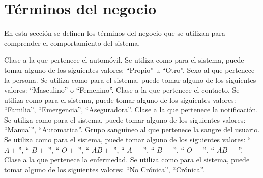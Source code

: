 \section{Términos del negocio}
\label{gls:terminosNegocio}
En esta sección se definen los términos del negocio que se utilizan para comprender el comportamiento del sistema.

\begin{description}
    
     Clase a la que pertenece el automóvil. Se utiliza como  para el sistema, puede tomar alguno de los siguientes valores: ``Propio'' u ``Otro''.
     Sexo al que pertenece la persona. Se utiliza como  para el sistema, puede tomar alguno de los siguientes valores: ``Masculino'' o ``Femenino''.
 	 Clase a la que pertenece el contacto. Se utiliza como  para el sistema, puede tomar alguno de los siguientes valores: ``Familia'', ``Emergencia'', ``Aseguradora''.
 	 Clase a la que pertenece la notificación. Se utiliza como  para el sistema, puede tomar alguno de los siguientes valores: ``Manual'', ``Automatica''.
 	 Grupo sanguíneo al que pertenece la sangre del usuario. Se utiliza como  para el sistema, puede tomar alguno de los siguientes valores: ``$A+$'', `` $B+$ '', `` $O+$ '', `` $AB+$ '', `` $A-$ '', `` $B-$ '', `` $O-$ '', `` $AB-$ ''.
 	 Clase a la que pertenece la enfermedad. Se utiliza como  para el sistema, puede tomar alguno de los siguientes valores: ``No Crónica'', ``Crónica''.
 	
 	


   
\end{description}
